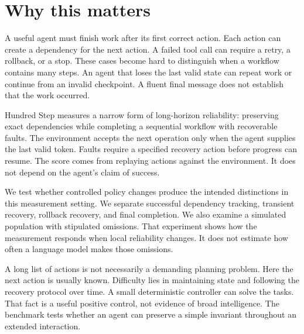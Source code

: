 \documentclass{article}
\title{\PaperTitle}
\author{Pooria Arab\\Independent researcher\\ORCID: \href{https://orcid.org/\AuthorOrcid}{\AuthorOrcid}}
\begin{document}
\maketitle
\begin{abstract}\AbstractText\end{abstract}
\section{Why this matters}
A useful agent must finish work after its first correct action. Each action can create a dependency for the next action. A failed tool call can require a retry, a rollback, or a stop. These cases become hard to distinguish when a workflow contains many steps. An agent that loses the last valid state can repeat work or continue from an invalid checkpoint. A fluent final message does not establish that the work occurred.\par
Hundred Step measures a narrow form of long-horizon reliability: preserving exact dependencies while completing a sequential workflow with recoverable faults. The environment accepts the next operation only when the agent supplies the last valid token. Faults require a specified recovery action before progress can resume. The score comes from replaying actions against the environment. It does not depend on the agent's claim of success.\par
We test whether controlled policy changes produce the intended distinctions in this measurement setting. We separate successful dependency tracking, transient recovery, rollback recovery, and final completion. We also examine a simulated population with stipulated omissions. That experiment shows how the measurement responds when local reliability changes. It does not estimate how often a language model makes those omissions.\par
A long list of actions is not necessarily a demanding planning problem. Here the next action is usually known. Difficulty lies in maintaining state and following the recovery protocol over time. A small deterministic controller can solve the tasks. That fact is a useful positive control, not evidence of broad intelligence. The benchmark tests whether an agent can preserve a simple invariant throughout an extended interaction.\par
\end{document}
